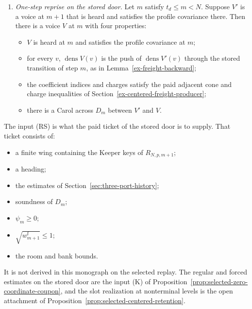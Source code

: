 \begin{enumerate}
\item[(RS)] \emph{One-step reprise on the stored door.} Let $m$ satisfy
  $t_d\le m<N$. Suppose $V'$ is a voice at $m+1$ that is heard and
  satisfies the profile covariance there. Then there is a voice $V$ at
  $m$ with four properties:
  \begin{itemize}
  \item $V$ is heard at $m$ and satisfies the profile covariance at $m$;
  \item for every $v$, $\operatorname{dens}V(v)$ is the push of
    $\operatorname{dens}V'(v)$ through the stored transition of step
    $m$, as in Lemma~\ref{ex-freight-backward};
  \item the coefficient indices and charges satisfy the paid adjacent
    cone and charge inequalities of
    Section~\ref{ex-centered-freight-producer};
  \item there is a Carol across $D_m$ between $V'$ and $V$.
  \end{itemize}
\end{enumerate}

The input (RS) is what the paid ticket of the stored door is to supply.
That ticket consists of:
\begin{itemize}
\item a finite wing containing the Keeper keys of $R_{N,p,m+1}$;
\item a heading;
\item the estimates of Section~\ref{sec:three-port-history};
\item soundness of $D_m$;
\item $\psi_m\ge0$;
\item $\sqrt{w^{\mathrm f}_{m+1}}\le1$;
\item the room and bank bounds.
\end{itemize}
It is not derived in this monograph on the selected replay. The
regular and forced estimates on the stored door are the input (K) of
Proposition~\ref{prop:selected-zero-coordinate-coupon}, and the slot
realization at nonterminal levels is the open attachment of
Proposition~\ref{prop:selected-centered-retention}.

